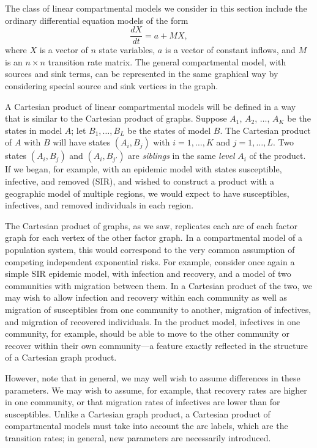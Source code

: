 \documentclass[review]{elsarticle}
\begin{document}
The class of linear compartmental models we consider in this section include the
ordinary differential equation models of the form
\[
\frac{dX}{dt} = a + M X,
\]
where $X$ is a vector of $n$ state variables, $a$ is a vector of constant inflows, and $M$ is an
$n \times n$ transition rate matrix.
The general compartmental model, with sources and sink terms, can be represented in the same graphical way by
considering special source and sink vertices in the graph.  

A Cartesian product of linear compartmental models will be defined in a way that is similar
to the Cartesian product of graphs.  
Suppose $A_1$, $A_2$, $\ldots$, $A_K$ be
the states in model $A$; let $B_1, \ldots, B_L$ be the states of model $B$.  The Cartesian
product of $A$ with $B$ will have states $(A_i, B_j)$ with $i = 1, \ldots, K$ and $j=1,\ldots, L$.
Two states $(A_i,B_j)$ and $(A_i,B_{j'})$ are {\it siblings} in the same {\it level} $A_i$ of the product.
If we began, for example, with an epidemic model with states susceptible, infective, and
removed (SIR), and wished to construct a product with a geographic model of multiple regions, we
would expect to have susceptibles, infectives, and removed individuals in each region.  

The Cartesian product of graphs, as we saw, replicates each arc of each factor graph for each
vertex of the other factor graph.  In a compartmental model of a population system, this would
correspond to the very common assumption of competing independent exponential risks.  For example,
consider once again a simple SIR epidemic model, with infection and recovery, and a model of
two communities with migration between them.  In a Cartesian product of the two, we may wish
to allow infection and recovery within each community as well as migration of susceptibles from one
community to another, migration of infectives, and migration of recovered individuals.  In the product
model, infectives in one community, for example, should be able to move to the other community or
recover within their own community---a feature exactly reflected in the structure of a Cartesian graph product.  

However, note that in general,
we may well wish to assume differences in these parameters.  We may wish to assume, for example, that
recovery rates are higher in one community, or that migration rates of infectives are lower than for
susceptibles.  Unlike a Cartesian graph product, a Cartesian product of compartmental models must
take into account the arc labels, which are the transition rates; in general, new parameters are
necessarily introduced.
\end{document}
